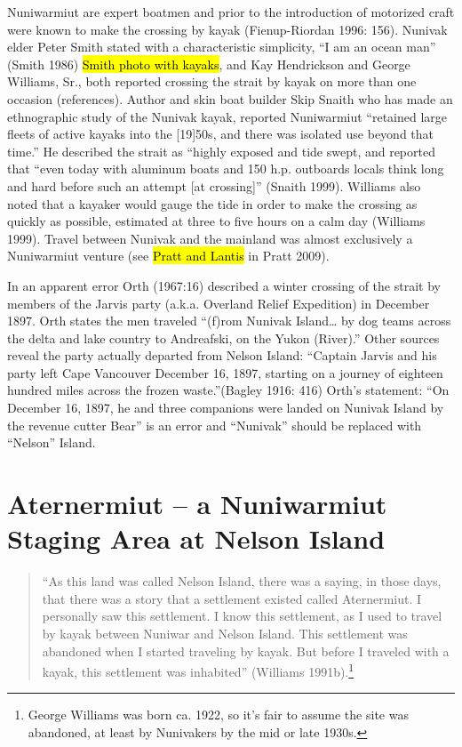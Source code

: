 Nuniwarmiut are expert boatmen and prior to the introduction of motorized craft were known to make the crossing by kayak (Fienup-Riordan 1996: 156).  Nunivak elder Peter Smith stated with a characteristic simplicity, “I am an ocean man” (Smith 1986) \hl{Smith photo with kayaks}, and Kay Hendrickson and George Williams, Sr., both reported crossing the strait by kayak on more than one occasion (references). Author and skin boat builder Skip Snaith who has made an ethnographic study of the Nunivak kayak, reported Nuniwarmiut “retained large fleets of active kayaks into the {[}19{]}50s, and there was isolated use beyond that time.” He described the strait as “highly exposed and tide swept, and reported that “even today with aluminum boats and 150 h.p. outboards locals think long and hard before such an attempt {[}at crossing{]}” (Snaith 1999). Williams also noted that a kayaker would gauge the tide in order to make the crossing as quickly as possible, estimated at three to five hours on a calm day (Williams 1999). Travel between Nunivak and the mainland was almost exclusively a Nuniwarmiut venture (see \hl{Pratt and Lantis} in Pratt 2009).

In an apparent error Orth (1967:16) described a winter crossing of the strait by members of the Jarvis party (a.k.a. Overland Relief Expedition) in December 1897. Orth states the men traveled “(f)rom Nunivak Island… by dog teams across the delta and lake country to Andreafski, on the Yukon (River).” Other sources reveal the party actually departed from Nelson Island: “Captain Jarvis and his party left Cape Vancouver December 16, 1897, starting on a journey of eighteen hundred miles across the frozen waste.”(Bagley 1916: 416) Orth’s statement: “On December 16, 1897, he and three companions were landed on Nunivak Island by the revenue cutter Bear” is an error and “Nunivak” should be replaced with “Nelson” Island.


\section{Aternermiut – a Nuniwarmiut Staging Area at Nelson Island}

\begin{quote}
	“As this land was called Nelson Island, there was a saying, in those days, that 	there was a story that a settlement existed called Aternermiut. I personally saw 	this settlement. I know this settlement, as I used to travel by kayak between 	Nuniwar and Nelson Island. This settlement was abandoned when I started 	traveling by kayak. But before I traveled with a kayak, this settlement was 	inhabited” (Williams 1991b).\footnote{George Williams was born ca. 1922, so it’s fair to assume the site was abandoned, at least by Nunivakers by the mid or late 1930s.}
\end{quote}



